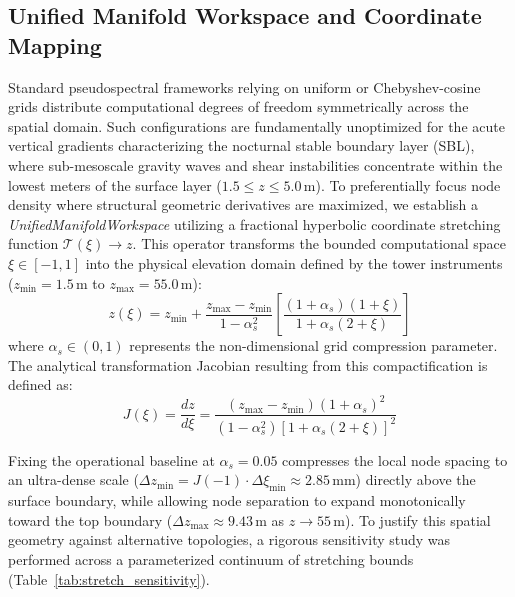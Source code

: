 \documentclass[11pt,a4paper]{article}
\begin{document}
\subsection{Unified Manifold Workspace and Coordinate Mapping}
\label{sec:methods:manifold}

Standard pseudospectral frameworks relying on uniform or Chebyshev-cosine grids distribute computational degrees of freedom symmetrically across the spatial domain. Such configurations are fundamentally unoptimized for the acute vertical gradients characterizing the nocturnal stable boundary layer (SBL), where sub-mesoscale gravity waves and shear instabilities concentrate within the lowest meters of the surface layer ($1.5 \le z \le 5.0\,\text{m}$). To preferentially focus node density where structural geometric derivatives are maximized, we establish a \emph{UnifiedManifoldWorkspace} utilizing a fractional hyperbolic coordinate stretching function $\mathcal{T}(\xi) \rightarrow z$. This operator transforms the bounded computational space $\xi \in [-1, 1]$ into the physical elevation domain defined by the tower instruments ($z_{\min} = 1.5\,\text{m}$ to $z_{\max} = 55.0\,\text{m}$):
\begin{equation}
z(\xi) = z_{\min} + \frac{z_{\max} - z_{\min}}{1 - \alpha_s^2} \left[ \frac{(1+\alpha_s)(1+\xi)}{1 + \alpha_s(2+\xi)} \right]
\label{eq:hyperbolic_stretch}
\end{equation}
where $\alpha_s \in (0, 1)$ represents the non-dimensional grid compression parameter. The analytical transformation Jacobian resulting from this compactification is defined as:
\begin{equation}
J(\xi) = \frac{dz}{d\xi} = \frac{(z_{\max} - z_{\min})(1 + \alpha_s)^2}{(1 - \alpha_s^2) \left[1 + \alpha_s(2+\xi)\right]^2}
\label{eq:jacobian_stretched}
\end{equation}

Fixing the operational baseline at $\alpha_s = 0.05$ compresses the local node spacing to an ultra-dense scale ($\Delta z_{\min} = J(-1) \cdot \Delta \xi_{\min} \approx 2.85\,\text{mm}$) directly above the surface boundary, while allowing node separation to expand monotonically toward the top boundary ($\Delta z_{\max} \approx 9.43\,\text{m}$ as $z \rightarrow 55\,\text{m}$). To justify this spatial geometry against alternative topologies, a rigorous sensitivity study was performed across a parameterized continuum of stretching bounds (Table~\ref{tab:stretch_sensitivity}).
\end{document}
